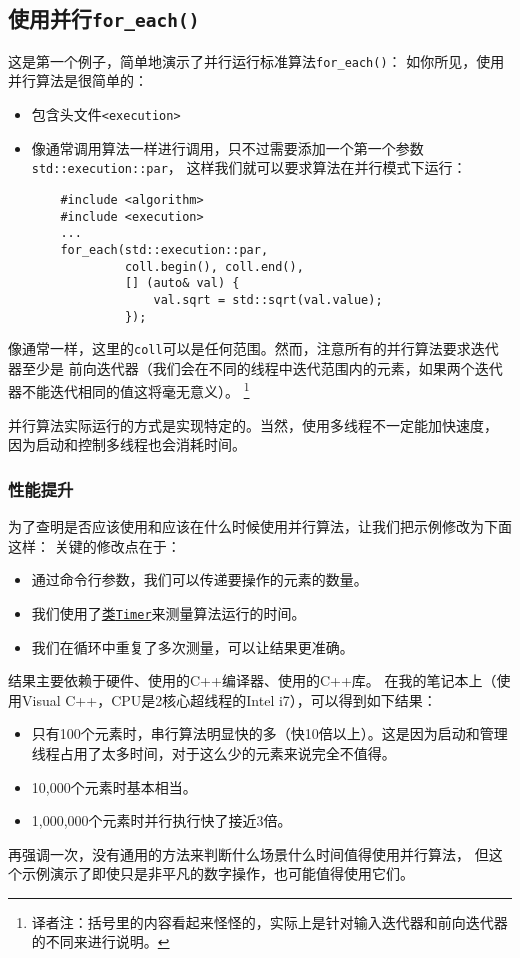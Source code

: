\subsection{使用并行\texttt{for\_each()}}
这是第一个例子，简单地演示了并行运行标准算法\texttt{for\_each()}：
如你所见，使用并行算法是很简单的：
\begin{itemize}
    \item 包含头文件\texttt{<execution>}
    \item 像通常调用算法一样进行调用，只不过需要添加一个第一个参数\texttt{std::execution::par}，
    这样我们就可以要求算法在并行模式下运行：
    \begin{lstlisting}
    #include <algorithm>
    #include <execution>
    ...
    for_each(std::execution::par,
             coll.begin(), coll.end(),
             [] (auto& val) {
                 val.sqrt = std::sqrt(val.value);
             });
    \end{lstlisting}
\end{itemize}
像通常一样，这里的\texttt{coll}可以是任何范围。然而，注意所有的并行算法要求迭代器至少是
前向迭代器（我们会在不同的线程中迭代范围内的元素，如果两个迭代器不能迭代相同的值这将毫无意义）。
\footnote{译者注：括号里的内容看起来怪怪的，实际上是针对输入迭代器和前向迭代器的不同来进行说明。}

并行算法实际运行的方式是实现特定的。当然，使用多线程不一定能加快速度，
因为启动和控制多线程也会消耗时间。

\subsubsection{性能提升}
为了查明是否应该使用和应该在什么时候使用并行算法，让我们把示例修改为下面这样：
关键的修改点在于：
\begin{itemize}
    \item 通过命令行参数，我们可以传递要操作的元素的数量。
    \item 我们使用了\hyperref[ch22.0.0.1]{类\texttt{Timer}}来测量算法运行的时间。
    \item 我们在循环中重复了多次测量，可以让结果更准确。
\end{itemize}
结果主要依赖于硬件、使用的C++编译器、使用的C++库。
在我的笔记本上（使用Visual C++，CPU是2核心超线程的Intel i7），可以得到如下结果：
\begin{itemize}
    \item 只有100个元素时，串行算法明显快的多（快10倍以上）。这是因为启动和管理线程占用了太多时间，对于这么少的元素来说完全不值得。
    \item 10,000个元素时基本相当。
    \item 1,000,000个元素时并行执行快了接近3倍。
\end{itemize}
再强调一次，没有通用的方法来判断什么场景什么时间值得使用并行算法，
但这个示例演示了即使只是非平凡的数字操作，也可能值得使用它们。


